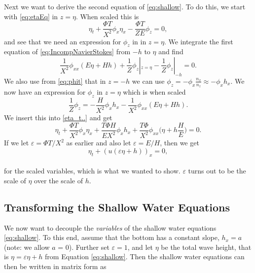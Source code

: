 \documentclass[11pt]{article}
\begin{document}
Next we want to derive the second equation of \eqref{eq:shallow}. To do this, we start with \eqref{eq:etaEq} in $z = \eta$. When scaled this is 
\begin{equation}
    \label{eta_t..}
    \eta_t + \frac{\Phi T}{X^2}\phi_x\eta_x - \frac{\Phi T}{ZE}\phi_z = 0,
\end{equation}
and see that we need an expression for $\phi_z$ in in $z = \eta$. We integrate the first equation of \eqref{eq:IncompNavierStokes} from $-h$ to $\eta$ and find 
\begin{equation*}    
    \frac{1}{X^2}\phi_{xx}(E\eta + Hh) + \frac{1}{Z}\phi_z|_{z=\eta} - \frac{1}{Z}\phi_z|_{-h} = 0.
\end{equation*}
We also use from \eqref{eq:phit} that in $z = -h$ we can use $\phi_z = -\phi_x\frac{n_x}{n_z} \approx -\phi_x h_x$. We now have an expression for $\phi_z$ in $z = \eta$ which is when scaled
\begin{equation*}
    \frac{1}{Z}\phi_z = - \frac{H}{X^2}\phi_x h_x - \frac{1}{X^2}\phi_{xx}(E\eta + Hh).
\end{equation*}
We insert this into \eqref{eta_t..} and get
\begin{equation*} 
    \eta_t + \frac{\Phi T}{X^2}\phi_x\eta_x + \frac{T\Phi H}{EX^2}\phi_x h_x + \frac{T\Phi}{X^2}\phi_{xx}\Big(\eta + h\frac{H}{E}\Big) = 0.
\end{equation*}
If we let $\varepsilon = \Phi T/X^2 $ as earlier and also let $\varepsilon = E/H$, then we get
\begin{equation*}
\eta_t + (u(\varepsilon\eta + h))_x = 0,
\end{equation*}\\

for the scaled variables, which is what we wanted to show. $\varepsilon$ turns out to be the scale of $\eta$ over the scale of $h$.
%
%
\subsection{Transforming the Shallow Water Equations}
We now want to decouple the \emph{variables} of the shallow water equations \eqref{eq:shallow}. To this end, 
assume that the bottom has a constant slope, $h_x = a$ (note: we allow $a$ = 0). Further set $\varepsilon =1$,
and let $\eta$ be the total wave height, that is $\eta = \varepsilon\eta + h$ from Equation \eqref{eq:shallow}.
Then the shallow water equations can then be written in matrix form as
\end{document}
